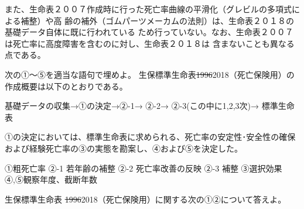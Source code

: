 \documentclass[report,gutter=10mm,fore-edge=10mm,uplatex,dvipdfmx]{jlreq}
\begin{document}
また、生命表２００７作成時に行った死亡率曲線の平滑化（グレビルの多項式による補整）や高
齢の補外（ゴムパーツメーカムの法則）は、生命表２０１８の基礎データ自体に既に行われている
ため行っていない。なお、生命表２００７は死亡率に高度障害を含むのに対し、生命表２０１８は
含まないことも異なる点である。


次の①～⑤を適当な語句で埋めよ。
生保標準生命表\sout{1996}2018（死亡保険用）の作成概要は以下のとおりである。 

\begin{center}
 基礎データの収集→①の決定→②-1→ ②-2→ ②-3(この中に1,2,3次)→ 標準生命表
\end{center}

①の決定においては、標準生命表に求められる、死亡率の安定性･安全性の確保および経験死亡率の③の実態を勘案し、④および⑤を決定した。

①粗死亡率 ②-1 若年齢の補整  ②-2 死亡率改善の反映 ②-3 補整 ③選択効果④,⑤観察年度、截断年数


生保標準生命表 \sout{1996}2018（死亡保険用）に関する次の①②について答えよ。
\end{document}
